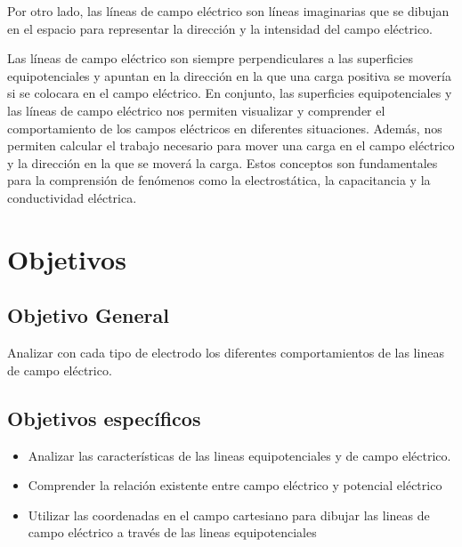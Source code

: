 \documentclass[letterpaper, 12pt]{report}
\begin{document}
\vspace{.5cm}

Por otro lado, las líneas de campo eléctrico son líneas
imaginarias que se dibujan en el espacio para representar
la dirección y la intensidad del campo eléctrico.

\vspace{.5cm}

Las líneas de campo eléctrico son siempre perpendiculares a las
superficies equipotenciales y apuntan en la dirección en la que una
carga positiva se movería si se colocara en el campo eléctrico.
En conjunto, las superficies equipotenciales y las líneas de campo eléctrico
nos permiten visualizar y comprender el comportamiento de los campos eléctricos
en diferentes situaciones. Además, nos permiten calcular el trabajo
necesario para mover una carga en el campo eléctrico y la dirección en
la que se moverá la carga. Estos conceptos son fundamentales para la
comprensión de fenómenos como la electrostática, la capacitancia y la
conductividad eléctrica.

\newpage

\section{Objetivos}

\subsection{Objetivo General}

Analizar con cada tipo de  electrodo los diferentes comportamientos de las
lineas de campo eléctrico.

\subsection*{Objetivos específicos}

\begin{itemize}
	\item Analizar las características de las lineas equipotenciales y de
	      campo eléctrico.
	\item Comprender la relación existente entre campo eléctrico y potencial
	      eléctrico
	\item Utilizar las coordenadas en el campo cartesiano para dibujar las
	      lineas de campo eléctrico a través de las lineas equipotenciales
\end{itemize}
\end{document}
